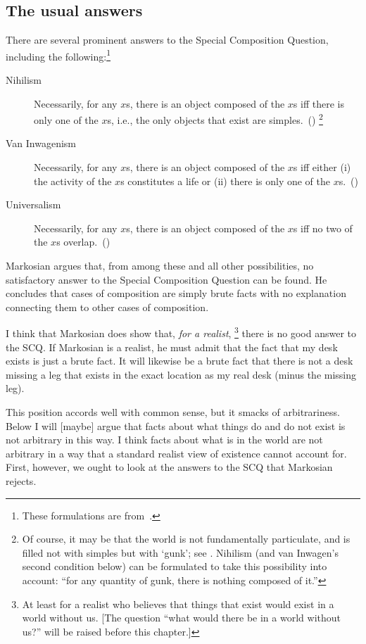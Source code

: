 \subsection{The usual answers}
There are several prominent answers to the Special Composition Question, including the following:\footnote{These formulations are from~\citet{markosian1998a}.}
\begin{description}
	\item[Nihilism] Necessarily, for any $x$s, there is an object composed of the $x$s iff there is only one of the $x$s, i.e., the only objects that exist are simples.~(\citeyear[219]{markosian1998a})%
		\footnote{Of course, it may be that the world is not fundamentally particulate, and is filled not with simples but with `gunk'; see \citet{schaffer2003}. Nihilism (and van Inwagen's second condition below) can be formulated to take this possibility into account: ``for any quantity of gunk, there is nothing composed of it.''}%
	\item[Van Inwagenism] Necessarily, for any $x$s, there is an object composed of the $x$s iff either (i) the activity of the $x$s constitutes a life or (ii) there is only one of the $x$s.~(\citeyear[221]{markosian1998a})
	\item[Universalism] Necessarily, for any $x$s, there is an object composed of the $x$s iff no two of the $x$s overlap.~(\citeyear[227]{markosian1998a})
\end{description}

Markosian argues that, from among these and all other possibilities, no satisfactory answer to the Special Composition Question can be found. He concludes that cases of composition are simply brute facts with no explanation connecting them to other cases of composition.

I think that Markosian does show that, {\em for a realist},%
\footnote{At least for a realist who believes that things that exist would exist in a world without us. [The question ``what would there be in a world without us?'' will be raised before this chapter.]} %
%
there is no good answer to the SCQ. If Markosian is a realist, he must admit that the fact that my desk exists is just a brute fact. It will likewise be a brute fact that there is not a desk missing a leg that exists in the exact location as my real desk (minus the missing leg).

This position accords well with common sense, but it smacks of arbitrariness. Below I will [maybe] argue that facts about what things do and do not exist is not arbitrary in this way. I think facts about what is in the world are not arbitrary in a way that a standard realist view of existence cannot account for. First, however, we ought to look at the answers to the SCQ that Markosian rejects.

